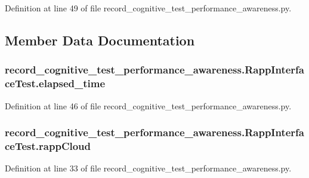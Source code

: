 Definition at line 49 of file record\-\_\-cognitive\-\_\-test\-\_\-performance\-\_\-awareness.\-py.



\subsection{Member Data Documentation}
\hypertarget{classrecord__cognitive__test__performance__awareness_1_1RappInterfaceTest_abd7737ffe7b3db058e8a00db3e8d06ff}{
\subsubsection[{elapsed\-\_\-time}]{\setlength{\rightskip}{0pt plus 5cm}record\-\_\-cognitive\-\_\-test\-\_\-performance\-\_\-awareness.\-Rapp\-Interface\-Test.\-elapsed\-\_\-time}}\label{classrecord__cognitive__test__performance__awareness_1_1RappInterfaceTest_abd7737ffe7b3db058e8a00db3e8d06ff}


Definition at line 46 of file record\-\_\-cognitive\-\_\-test\-\_\-performance\-\_\-awareness.\-py.

\hypertarget{classrecord__cognitive__test__performance__awareness_1_1RappInterfaceTest_a22afd4de94643bff6061b34ed4067fd2}{
\subsubsection[{rapp\-Cloud}]{\setlength{\rightskip}{0pt plus 5cm}record\-\_\-cognitive\-\_\-test\-\_\-performance\-\_\-awareness.\-Rapp\-Interface\-Test.\-rapp\-Cloud}}\label{classrecord__cognitive__test__performance__awareness_1_1RappInterfaceTest_a22afd4de94643bff6061b34ed4067fd2}


Definition at line 33 of file record\-\_\-cognitive\-\_\-test\-\_\-performance\-\_\-awareness.\-py.

